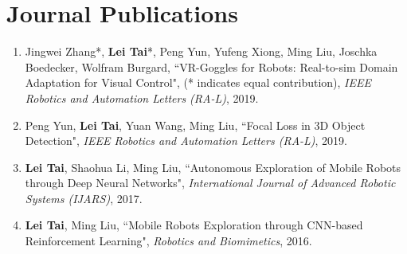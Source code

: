 \section*{Journal Publications}
\begin{enumerate}
	\item Jingwei Zhang*, {\bf Lei Tai}*, Peng Yun, Yufeng Xiong, Ming Liu, Joschka Boedecker, Wolfram Burgard, ``VR-Goggles for Robots: Real-to-sim Domain Adaptation for Visual Control", (* indicates equal contribution), \emph{IEEE Robotics and Automation Letters (RA-L)}, 2019.
  \item Peng Yun, {\bf Lei Tai}, Yuan Wang, Ming Liu, ``Focal Loss in 3D Object Detection", \emph{IEEE Robotics and Automation Letters (RA-L)}, 2019.
  \item {\bf Lei Tai}, Shaohua Li, Ming Liu, ``Autonomous Exploration of Mobile Robots through Deep Neural Networks", \emph{International Journal of Advanced Robotic Systems (IJARS)}, 2017.
  \item {\bf Lei Tai}, Ming Liu, ``Mobile Robots Exploration through CNN-based Reinforcement Learning", \emph{Robotics and Biomimetics}, 2016.
\end{enumerate}
